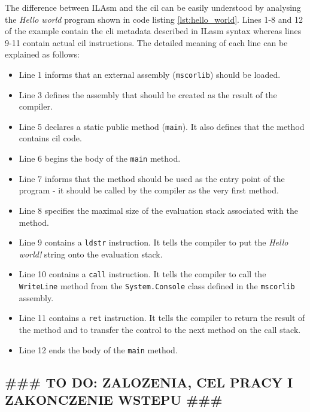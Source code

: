 \documentclass{article}
\numberwithin{equation}{section}
\begin{document}
The difference between ILAsm and the \acrshort{cil} can be easily understood by analysing the \textit{Hello world} program shown in code listing \ref{lst:hello_world}. Lines 1-8 and 12 of the example contain the \acrshort{cli} metadata described in ILasm syntax whereas lines 9-11 contain actual \acrshort{cil} instructions. The detailed meaning of each line can be explained as follows:
\begin{itemize}
	\item{Line 1 informs that an external assembly (\texttt{mscorlib}) should be loaded.}
	\item{Line 3 defines the assembly that should be created as the result of the compiler.}
	\item{Line 5 declares a static public method (\texttt{main}). It also defines that the method contains \acrshort{cil} code.}
	\item{Line 6 begins the body of the \texttt{main} method.}
	\item{Line 7 informs that the method should be used as the entry point of the program - it should be called by the compiler as the very first method.}
	\item{Line 8 specifies the maximal size of the evaluation stack associated with the method.}
	\item{Line 9 contains a \texttt{ldstr} instruction. It tells the compiler to put the \textit{Hello world!} string onto the evaluation stack.}
	\item{Line 10 contains a \texttt{call} instruction. It tells the compiler to call the \texttt{WriteLine} method from the \texttt{System.Console} class defined in the \texttt{mscorlib} assembly.}
	\item{Line 11 contains a \texttt{ret} instruction. It tells the compiler to return the result of the method and to transfer the control to the next method on the call stack.}
	\item{Line 12 ends the body of the \texttt{main} method.}
\end{itemize}

\subsection{{\#\#\# TO DO: ZALOZENIA, CEL PRACY I ZAKONCZENIE WSTEPU \#\#\#}}

\clearpage

\end{document}
